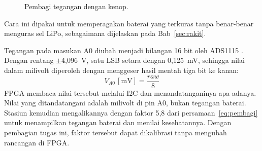 \documentclass[11pt,a4paper]{article}
\begin{document}
\begin{figure}[H]
  \centering
  \caption{Pembagi tegangan dengan kenop.}
  \label{fig:pembagi}
\end{figure} Cara ini dipakai untuk memperagakan baterai
yang terkuras tanpa benar-benar menguras sel LiPo, sebagaimana dijelaskan pada
Bab~\ref{sec:rakit}.

Tegangan pada masukan A0 diubah menjadi bilangan 16 bit oleh ADS1115 \cite{ads1115}. Dengan
rentang $\pm$4,096~V, satu LSB setara dengan 0,125~mV, sehingga nilai dalam milivolt diperoleh
dengan menggeser hasil mentah tiga bit ke kanan:
\begin{equation}
  V_{A0}\,[\mathrm{mV}] = \frac{\mathit{raw}}{8}
  \label{eq:adc}
\end{equation}
FPGA membaca nilai tersebut melalui I2C dan menandatanganinya apa adanya. Nilai yang
ditandatangani adalah milivolt di pin A0, bukan tegangan baterai. Stasiun kemudian
mengalikannya dengan faktor 5,8 dari persamaan~\eqref{eq:pembagi} untuk menampilkan tegangan
baterai dan menilai kesehatannya. Dengan pembagian tugas ini, faktor tersebut dapat dikalibrasi
tanpa mengubah rancangan di FPGA.

\end{document}
